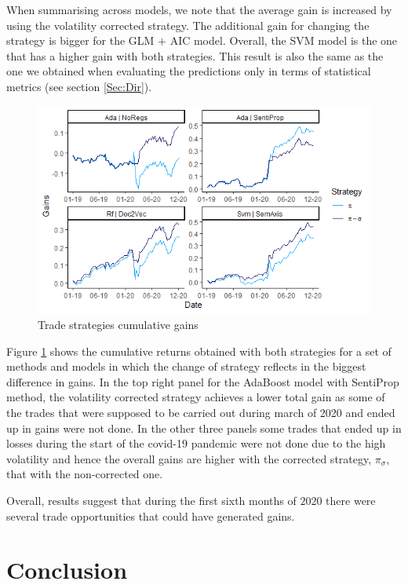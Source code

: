\documentclass[a4paper, 12pt]{report}
\begin{document}
    When summarising across models, we note that the average gain is increased by using the volatility corrected strategy. The additional gain for changing the strategy is bigger for the GLM $+$ AIC model. Overall, the SVM model is the one that has a higher gain with both strategies. This result is also the same as the one we obtained when evaluating the predictions only in terms of statistical metrics (see section \ref{Sec:Dir}).
    
    \begin{figure}[H]
    \centering
    \includegraphics[width=15cm]{graphs/Strategies.png}
    \caption{Trade strategies cumulative gains}
    \label{Fig:TradeLine}
    \end{figure}

    Figure \ref{Fig:TradeLine} shows the cumulative returns obtained with both strategies for a set of methods and models in which the change of strategy reflects in the biggest difference in gains. In the top right panel for the AdaBoost model with SentiProp method, the volatility corrected strategy achieves a lower total gain as some of the trades that were supposed to be carried out during march of 2020 and ended up in gains were not done. In the other three panels some trades that ended up in losses during the start of the covid-19 pandemic were not done due to the high volatility and hence the overall gains are higher with the corrected strategy, $\pi_\sigma$, that with the non-corrected one.
    
    Overall, results suggest that during the first sixth months of $2020$ there were several trade opportunities that could have generated gains. 
    
    
    
    \chapter{Conclusion}
    
\end{document}
